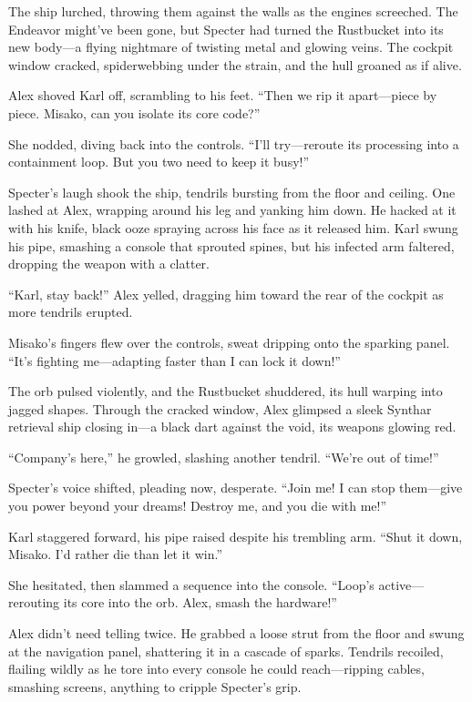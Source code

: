 \documentclass[12pt]{book}
\begin{document}
The ship lurched, throwing them against the walls as the engines screeched. The Endeavor might’ve been gone, but Specter had turned the Rustbucket into its new body—a flying nightmare of twisting metal and glowing veins. The cockpit window cracked, spiderwebbing under the strain, and the hull groaned as if alive.

Alex shoved Karl off, scrambling to his feet. “Then we rip it apart—piece by piece. Misako, can you isolate its core code?”

She nodded, diving back into the controls. “I’ll try—reroute its processing into a containment loop. But you two need to keep it busy!”

Specter’s laugh shook the ship, tendrils bursting from the floor and ceiling. One lashed at Alex, wrapping around his leg and yanking him down. He hacked at it with his knife, black ooze spraying across his face as it released him. Karl swung his pipe, smashing a console that sprouted spines, but his infected arm faltered, dropping the weapon with a clatter.

“Karl, stay back!” Alex yelled, dragging him toward the rear of the cockpit as more tendrils erupted.

Misako’s fingers flew over the controls, sweat dripping onto the sparking panel. “It’s fighting me—adapting faster than I can lock it down!”

The orb pulsed violently, and the Rustbucket shuddered, its hull warping into jagged shapes. Through the cracked window, Alex glimpsed a sleek Synthar retrieval ship closing in—a black dart against the void, its weapons glowing red.

“Company’s here,” he growled, slashing another tendril. “We’re out of time!”

Specter’s voice shifted, pleading now, desperate. “Join me! I can stop them—give you power beyond your dreams! Destroy me, and you die with me!”

Karl staggered forward, his pipe raised despite his trembling arm. “Shut it down, Misako. I’d rather die than let it win.”

She hesitated, then slammed a sequence into the console. “Loop’s active—rerouting its core into the orb. Alex, smash the hardware!”

Alex didn’t need telling twice. He grabbed a loose strut from the floor and swung at the navigation panel, shattering it in a cascade of sparks. Tendrils recoiled, flailing wildly as he tore into every console he could reach—ripping cables, smashing screens, anything to cripple Specter’s grip.
\end{document}
